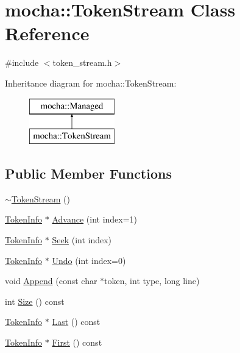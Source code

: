 \hypertarget{classmocha_1_1_token_stream}{
\section{mocha::TokenStream Class Reference}
\label{classmocha_1_1_token_stream}
}


{\ttfamily \#include $<$token\_\-stream.h$>$}

Inheritance diagram for mocha::TokenStream:\begin{figure}[H]
\begin{center}
\leavevmode
\includegraphics[height=2.000000cm]{classmocha_1_1_token_stream}
\end{center}
\end{figure}
\subsection*{Public Member Functions}
\begin{DoxyCompactItemize}
\item 
\hyperlink{classmocha_1_1_token_stream_aaee8c9a07899de5195ee01e274d50eb7}{$\sim$TokenStream} ()
\item 
\hyperlink{classmocha_1_1_token_info}{TokenInfo} $\ast$ \hyperlink{classmocha_1_1_token_stream_a6903c569c84bdbb265aee14a50c41ba0}{Advance} (int index=1)
\item 
\hyperlink{classmocha_1_1_token_info}{TokenInfo} $\ast$ \hyperlink{classmocha_1_1_token_stream_abc6ea0a6410cf9b7e4a730806be87c14}{Seek} (int index)
\item 
\hyperlink{classmocha_1_1_token_info}{TokenInfo} $\ast$ \hyperlink{classmocha_1_1_token_stream_a67b531f000b58f2dc7ce63a25ac36057}{Undo} (int index=0)
\item 
void \hyperlink{classmocha_1_1_token_stream_a8d1c62c777139b7e0138bdadafc15c8d}{Append} (const char $\ast$token, int type, long line)
\item 
int \hyperlink{classmocha_1_1_token_stream_afc8590e2538bdd9af89cda9183026f6a}{Size} () const 
\item 
\hyperlink{classmocha_1_1_token_info}{TokenInfo} $\ast$ \hyperlink{classmocha_1_1_token_stream_a35ffa07b7198ddc580a370c837c86056}{Last} () const 
\item 
\hyperlink{classmocha_1_1_token_info}{TokenInfo} $\ast$ \hyperlink{classmocha_1_1_token_stream_a3c8b7a96404c2f80daaed4aa77cdfbbc}{First} () const 
\end{DoxyCompactItemize}
